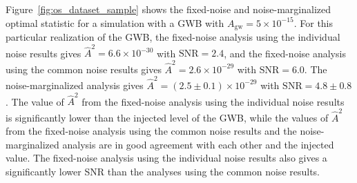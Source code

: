 \documentclass[twocolumn,aps,prd,superscriptaddress]{revtex4-1}
\newcommand{\Agw}{\ensuremath{A_\mathrm{gw}}}
\begin{document}

Figure~\ref{fig:os_dataset_sample} shows the fixed-noise and noise-marginalized 
optimal statistic for a simulation with a GWB with $\Agw=5\times10^{-15}$. 
For this particular realization of the GWB, 
the fixed-noise analysis 
using the individual noise results gives 
$\hat{A}^2 = 6.6\times10^{-30}$ with $\mathrm{SNR} = 2.4$, 
and the fixed-noise analysis using the common noise results gives 
$\hat{A}^2 = 2.6\times10^{-29}$ with $\mathrm{SNR} = 6.0$. 
The noise-marginalized analysis gives $\hat{A}^2 = (2.5 \pm 0.1)\times10^{-29}$ 
with $\mathrm{SNR}=4.8\pm0.8$. 
The value of $\hat{A}^2$ from the fixed-noise analysis using the individual noise results 
is significantly lower than the injected level of the GWB, while 
the values of $\hat{A}^2$ from the fixed-noise analysis using the common noise results 
and the noise-marginalized analysis are in good agreement with each other and the injected value. 
The fixed-noise analysis using the individual noise results also gives a significantly lower SNR 
than the analyses using the common noise results. 
\end{document}
